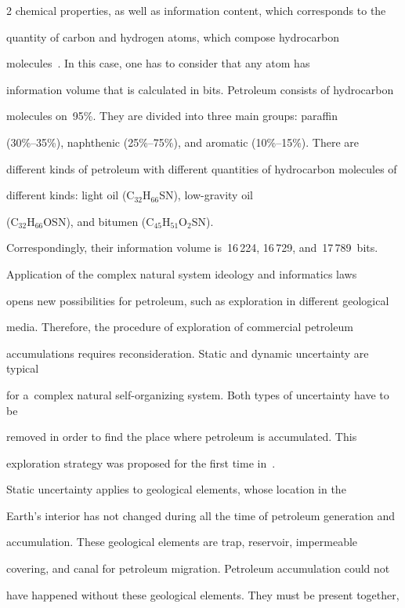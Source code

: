\begin{multicols}{2}
chemical properties, as well as information content, which corresponds to the 

quantity of carbon and hydrogen atoms, which compose hydrocarbon 

molecules~\cite{13-seif}. In this case, one has to consider that any atom has 

information volume that is calculated in bits. Petroleum consists of hydrocarbon 

molecules on~95\%. They are divided into three main groups: paraffin  

(30\%--35\%), naphthenic (25\%--75\%), and aromatic (10\%--15\%). There are 

different kinds of petroleum with different quantities of hydrocarbon molecules of 

different kinds: light oil (C$_{32}$H$_{66}$SN), low-gravity oil 

(C$_{32}$H$_{66}$OSN), and bitumen (C$_{45}$H$_{51}$O$_2$SN). 

Correspondingly, their information volume is~16\,224, 16\,729, and~17\,789~bits.

     

     Application of the complex natural system ideology and informatics laws 

opens new possibilities for petroleum, such as exploration in different geological 

media. Therefore, the procedure of exploration of commercial petroleum 

accumulations requires reconsideration. Static and dynamic uncertainty are typical 

for a~complex natural self-organizing system. Both types of uncertainty have to be 

removed in order to find the place where petroleum is accumulated. This 

exploration strategy was proposed for the first time in~\cite{12-seif}.

     

     Static uncertainty applies to geological elements, whose location in the 

Earth's interior has not changed during all the time of petroleum generation and 

accumulation. These geological elements are trap, reservoir, impermeable 

covering, and canal for petroleum migration. Petroleum accumulation could not 

have happened without these geological elements. They must be present together, 


\end{multicols}
